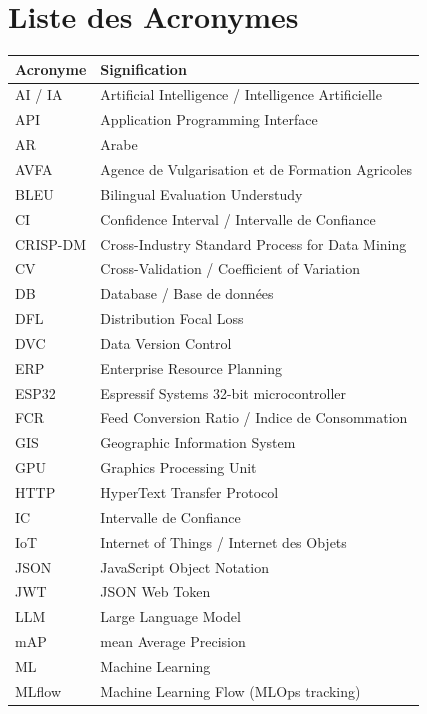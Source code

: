 
\chapter*{Liste des Acronymes}
\begin{longtable}{lp{10cm}}
\toprule
\textbf{Acronyme} & \textbf{Signification} \\
\midrule
\endhead
AI / IA & Artificial Intelligence / Intelligence Artificielle \\
API & Application Programming Interface \\
AR & Arabe \\
AVFA & Agence de Vulgarisation et de Formation Agricoles \\
BLEU & Bilingual Evaluation Understudy \\
CI & Confidence Interval / Intervalle de Confiance \\
CRISP-DM & Cross-Industry Standard Process for Data Mining \\
CV & Cross-Validation / Coefficient of Variation \\
DB & Database / Base de données \\
DFL & Distribution Focal Loss \\
DVC & Data Version Control \\
ERP & Enterprise Resource Planning \\
ESP32 & Espressif Systems 32-bit microcontroller \\
FCR & Feed Conversion Ratio / Indice de Consommation \\
GIS & Geographic Information System \\
GPU & Graphics Processing Unit \\
HTTP & HyperText Transfer Protocol \\
IC & Intervalle de Confiance \\
IoT & Internet of Things / Internet des Objets \\
JSON & JavaScript Object Notation \\
JWT & JSON Web Token \\
LLM & Large Language Model \\
mAP & mean Average Precision \\
ML & Machine Learning \\
MLflow & Machine Learning Flow (MLOps tracking) \\

\end{longtable}
